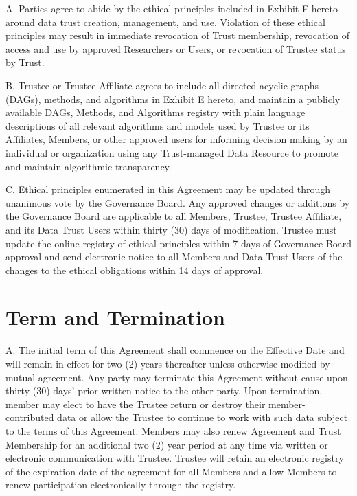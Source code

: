 \documentclass[]{book}
\begin{document}
A. Parties agree to abide by the ethical principles included in Exhibit F hereto around data trust creation, management, and use. Violation of these ethical principles may result in immediate revocation of Trust membership, revocation of access and use by approved Researchers or Users, or revocation of Trustee status by Trust.

B. Trustee or Trustee Affiliate agrees to include all directed acyclic graphs (DAGs), methods, and algorithms in Exhibit E hereto, and maintain a publicly available DAGs, Methods, and Algorithms registry with plain language descriptions of all relevant algorithms and models used by Trustee or its Affiliates, Members, or other approved users for informing decision making by an individual or organization using any Trust-managed Data Resource to promote and maintain algorithmic transparency.

C. Ethical principles enumerated in this Agreement may be updated through unanimous vote by the Governance Board. Any approved changes or additions by the Governance Board are applicable to all Members, Trustee, Trustee Affiliate, and its Data Trust Users within thirty (30) days of modification. Trustee must update the online registry of ethical principles within 7 days of Governance Board approval and send electronic notice to all Members and Data Trust Users of the changes to the ethical obligations within 14 days of approval.

\hypertarget{term-and-termination}{%
\chapter{Term and Termination}\label{term-and-termination}}

A. The initial term of this Agreement shall commence on the Effective Date and will remain in effect for two (2) years thereafter unless otherwise modified by mutual agreement. Any party may terminate this Agreement without cause upon thirty (30) days' prior written notice to the other party. Upon termination, member may elect to have the Trustee return or destroy their member-contributed data or allow the Trustee to continue to work with such data subject to the terms of this Agreement. Members may also renew Agreement and Trust Membership for an additional two (2) year period at any time via written or electronic communication with Trustee. Trustee will retain an electronic registry of the expiration date of the agreement for all Members and allow Members to renew participation electronically through the registry.
\end{document}
